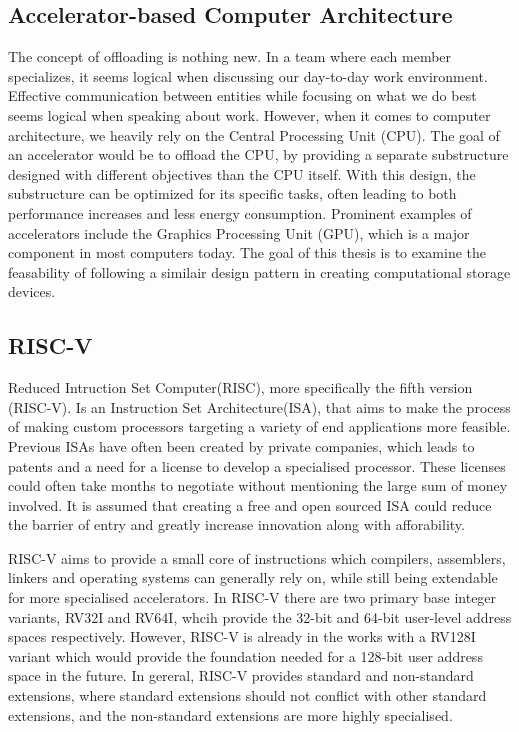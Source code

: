 \subsection{Accelerator-based Computer Architecture}\label{sec:ACA}
The concept of offloading is nothing new. In a team where each member
specializes, it seems logical when discussing our day-to-day work environment.
Effective communication between entities while focusing on what we do best seems
logical when speaking about work. However, when it comes to computer
architecture, we heavily rely on the Central Processing Unit (CPU). The goal of
an accelerator would be to offload the CPU, by providing a separate
substructure designed with different objectives than the CPU itself.
With this design, the substructure can be optimized for its
specific tasks, often leading to both performance increases and less energy
consumption\cite{AA}. Prominent examples of accelerators include the Graphics
Processing Unit (GPU), which is a major component in most computers today. The
goal of this thesis is to examine the feasability of following a similair design
pattern in creating computational storage devices.

\subsection{RISC-V}
Reduced Intruction Set Computer(RISC), more specifically the fifth version
(RISC-V). Is an Instruction Set Architecture(ISA), that aims to make the process
of making custom processors targeting a variety of end applications more
feasible. Previous ISAs have often been created by private companies, which
leads to patents and a need for a license to develop a specialised processor.
These licenses could often take months to negotiate without mentioning the large
sum of money involved. It is assumed that creating a free and open sourced ISA
could reduce the barrier of entry and greatly increase innovation along with
afforability\cite{ISAfree}.

RISC-V aims to provide a small core of instructions which compilers, assemblers,
linkers and operating systems can generally rely on, while still being
extendable for more specialised accelerators. In RISC-V there  are two primary
base integer variants, RV32I and RV64I, whcih provide the 32-bit and 64-bit
user-level address spaces respectively. However, RISC-V is already in the works
with a RV128I variant which would provide the foundation needed for a 128-bit
user address space in the future. In gereral, RISC-V provides standard and
non-standard extensions, where standard extensions should not conflict with
other standard extensions, and the non-standard extensions are more highly
specialised.


